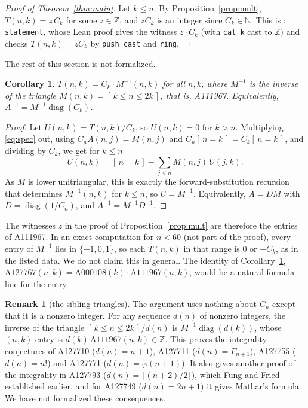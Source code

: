 \documentclass[11pt]{amsart}
\theoremstyle{plain}
\newtheorem{corollary}[theorem]{Corollary}
\theoremstyle{definition}
\newtheorem{remark}[theorem]{Remark}
\newcommand{\N}{\mathbb{N}}
\newcommand{\Z}{\mathbb{Z}}
\newcommand{\ib}[1]{[\,#1\,]}
\newcommand{\diag}{\operatorname{diag}}
\begin{document}
\begin{proof}[Proof of Theorem~\ref{thm:main}]
Let $k\le n$. By Proposition~\ref{prop:mult}, $T(n,k)=z\,C_k$ for some $z\in\Z$, and $zC_k$ is an integer since $C_k\in\N$. This is : \texttt{statement}, whose Lean proof gives the witness $z\cdot C_k$ (with \texttt{cat k} cast to $\Z$) and checks $T(n,k)=zC_k$ by \texttt{push\_cast} and \texttt{ring}.
\end{proof}

The rest of this section is not formalized.

\begin{corollary}\label{cor:A111967}
$T(n,k)=C_k\cdot M^{-1}(n,k)$ for all $n,k$, where $M^{-1}$ is the inverse of the triangle $M(n,k)=\ib{k\le n\le2k}$, that is, A111967. Equivalently, $A^{-1}=M^{-1}\diag(C_k)$.
\end{corollary}

\begin{proof}
Let $U(n,k)=T(n,k)/C_k$, so $U(n,k)=0$ for $k>n$. Multiplying \eqref{eq:spec} out, using $C_nA(n,j)=M(n,j)$ and $C_n\ib{n=k}=C_k\ib{n=k}$, and dividing by $C_k$, we get for $k\le n$
\[
  U(n,k)=\ib{n=k}-\sum_{j<n}M(n,j)\,U(j,k).
\]
As $M$ is lower unitriangular, this is exactly the forward-substitution recursion that determines $M^{-1}(n,k)$ for $k\le n$, so $U=M^{-1}$. Equivalently, $A=D M$ with $D=\diag(1/C_n)$, and $A^{-1}=M^{-1}D^{-1}$.
\end{proof}

The witnesses $z$ in the proof of Proposition~\ref{prop:mult} are therefore the entries of A111967. In an exact computation for $n<60$ (not part of the proof), every entry of $M^{-1}$ lies in $\{-1,0,1\}$, so each $T(n,k)$ in that range is $0$ or $\pm C_k$, as in the listed data. We do not claim this in general. The identity of Corollary~\ref{cor:A111967}, $\mathrm{A127767}(n,k)=\mathrm{A000108}(k)\cdot\mathrm{A111967}(n,k)$, would be a natural formula line for the entry.

\begin{remark}[the sibling triangles]\label{rem:siblings}
The argument uses nothing about $C_n$ except that it is a nonzero integer. For any sequence $d(n)$ of nonzero integers, the inverse of the triangle $\ib{k\le n\le 2k}/d(n)$ is $M^{-1}\diag(d(k))$, whose $(n,k)$ entry is $d(k)\,\mathrm{A111967}(n,k)\in\Z$. This proves the integrality conjectures of A127710 ($d(n)=n+1$), A127711 ($d(n)=F_{n+1}$), A127755 ($d(n)=n!$) and A127771 ($d(n)=\varphi(n+1)$). It also gives another proof of the integrality in A127793 ($d(n)=\lfloor(n+2)/2\rfloor$), which Fung and Fried \cite{Fried} established earlier, and for A127749 ($d(n)=2n+1$) it gives Mathar's formula. We have not formalized these consequences.
\end{remark}
\end{document}
